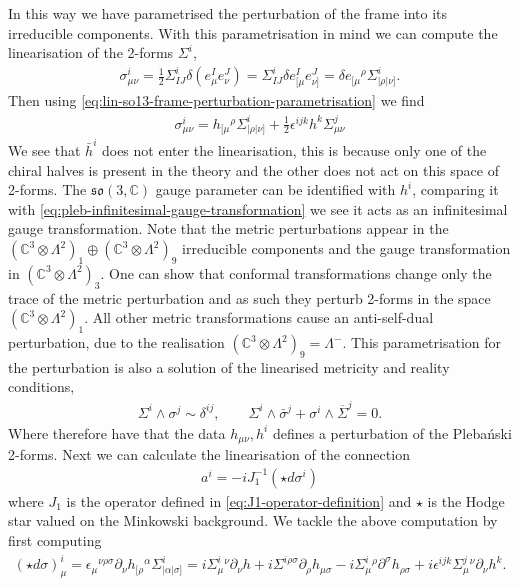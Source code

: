 \documentclass[10pt]{report}
\newcommand{\pleb}[0]{Pleba\'nski}
\theoremstyle{definition}
\newcommand{\C}[0]{\mathbb{C}}
\newcommand{\soC}{\mathfrak{so}{(3,\C)}}
\newcommand{\E}[0]{\C^3}
\newcommand{\asd}[0]{\overline{\Sigma}}
\begin{document}
In this way we have parametrised the perturbation of the frame into its irreducible components. With this parametrisation in mind we can compute the linearisation of the 2-forms $\Sigma^i$,
\begin{align}
    \sigma^i_{\mu\nu} = \frac{1}{2} \Sigma^i_{IJ} \delta( e^I_\mu e^J_\nu ) = \Sigma^i_{IJ} \delta e^I_{[\mu} e^J_{\nu]} = \delta e_{[\mu}{}^\rho \Sigma^i_{|\rho|\nu]}.
\end{align}
Then using \cref{eq:lin-so13-frame-perturbation-parametrisation} we find 
\begin{align}
    \sigma^i_{\mu\nu} = h_{[\mu}{}^\rho \Sigma^i_{|\rho|\nu]} + \frac{1}{2} \epsilon^{ijk} h^k \Sigma^j_{\mu\nu}  \label{eq:lin-full-frame-Sigma-perturbation}
\end{align}
We see that $\bar{h}^i$ does not enter the linearisation, this is because only one of the chiral halves is present in the theory and the other does not act on this space of 2-forms. The $\soC$ gauge parameter can be identified with $h^i$, comparing it with \cref{eq:pleb-infinitesimal-gauge-transformation} we see it acts as an infinitesimal gauge transformation. Note that the metric perturbations appear in the $(\E \otimes \Lambda^2)_1 \oplus (\E \otimes \Lambda^2)_9$ irreducible components and the gauge transformation in $(\E \otimes \Lambda^2)_3$. One can show that conformal transformations change only the trace of the metric perturbation and as such they perturb 2-forms in the space $(\E \otimes \Lambda^2)_1$. All other metric transformations cause an anti-self-dual perturbation, due to the realisation $(\E \otimes \Lambda^2)_9 = \Lambda^-$. This parametrisation for the perturbation is also a solution of the linearised metricity and reality conditions,
\begin{align}
    \Sigma^i \wedge \sigma^j \sim \delta^{ij}, \qquad \Sigma^i \wedge \bar{\sigma}^j + \sigma^i \wedge \asd^j = 0.
\end{align}
Where therefore have that the data $h_{\mu\nu}, h^i$ defines a perturbation of the \pleb{} 2-forms. Next we can calculate the linearisation of the connection
\begin{align}
    a^i = -i J_1^{-1}(\star d \sigma^i) \label{eq:lin-connection-perturbation-in-Sigma-perturbation}
\end{align}
where $J_1$ is the operator defined in \cref{eq:J1-operator-definition} and $\star$ is the Hodge star valued on the Minkowski background. We tackle the above computation by first computing
\begin{align}
    (\star d \sigma)^i_\mu = \epsilon_{\mu}{}^{\nu\rho\sigma} \partial_\nu h_{[\rho}{}^\alpha \Sigma^i_{|\alpha|\sigma]} = i \Sigma^i_\mu{}^\nu \partial_\nu h + i \Sigma^{i\rho\sigma} \partial_\rho h_{\mu\sigma} - i \Sigma^i_\mu{}^\rho \partial^\sigma h_{\rho\sigma} + i \epsilon^{ijk} \Sigma^j_\mu{}^\nu \partial_\nu h^k.
\end{align}
\end{document}
